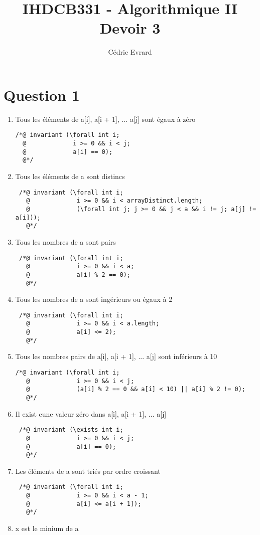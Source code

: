 \documentclass{article}
\title{IHDCB331 - Algorithmique II\\
	\large{Devoir 3}
}
\author{Cédric Evrard}
\begin{document}
\maketitle

\section{Question 1}
\begin{enumerate}
	\item Tous les éléments de a[i], a[i + 1], ... a[j] sont égaux à zéro
\begin{lstlisting}
/*@ invariant (\forall int i;
  @             i >= 0 && i < j;
  @             a[i] == 0);
  @*/
\end{lstlisting}
	\item Tous les éléments de a sont distincs
\begin{lstlisting}
 /*@ invariant (\forall int i;
   @             i >= 0 && i < arrayDistinct.length;
   @             (\forall int j; j >= 0 && j < a && i != j; a[j] != a[i]));
   @*/
\end{lstlisting}
	\item Tous les nombres de a sont pairs
\begin{lstlisting}
 /*@ invariant (\forall int i;
   @             i >= 0 && i < a;
   @             a[i] % 2 == 0);
   @*/
\end{lstlisting}
	\item Tous les nombres de a sont ingérieurs ou égaux à 2
\begin{lstlisting}
 /*@ invariant (\forall int i;
   @             i >= 0 && i < a.length;
   @             a[i] <= 2);
   @*/
\end{lstlisting}
	\item Tous les nombres pairs de a[i], a[i + 1], ... a[j] sont inférieurs à 10
\begin{lstlisting}
/*@ invariant (\forall int i;
   @             i >= 0 && i < j;
   @             (a[i] % 2 == 0 && a[i] < 10) || a[i] % 2 != 0);
   @*/
\end{lstlisting}
	\item Il exist eune valeur zéro dans a[i], a[i + 1], ... a[j]
\begin{lstlisting}
 /*@ invariant (\exists int i;
   @             i >= 0 && i < j;
   @             a[i] == 0);
   @*/
\end{lstlisting}
	\item Les éléments de a sont triés par ordre croissant
\begin{lstlisting}
 /*@ invariant (\forall int i;
   @             i >= 0 && i < a - 1;
   @             a[i] <= a[i + 1]);
   @*/
\end{lstlisting}
	\item x est le minium de a
\begin{lstlisting}

\end{lstlisting}
\end{enumerate}
\end{document}

